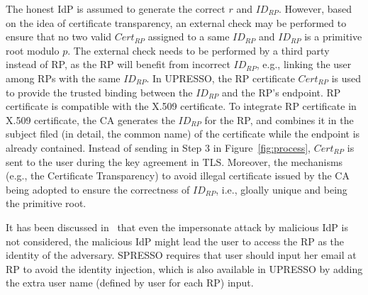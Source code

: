  The honest IdP is assumed to generate the correct $r$ and $ID_{RP}$. 
However, based on the idea of certificate transparency, 
an external check may be performed to ensure that  no two valid $Cert_{RP}$ assigned to a same $ID_{RP}$ and $ID_{RP}$ is a primitive root modulo $p$.
The external check needs to be performed by a third party instead of RP, as the RP will benefit from incorrect $ID_{RP}$, e.g., linking the user among RPs with the same  $ID_{RP}$. 
In UPRESSO, the RP certificate $Cert_{RP}$ is used to provide the trusted binding between the $ID_{RP}$ and the RP's endpoint. RP certificate is compatible with the X.509 certificate. To integrate RP certificate in X.509 certificate, the CA generates the $ID_{RP}$ for the RP, and combines it in the subject  filed (in detail, the common name)  of the certificate while the endpoint is already contained. Instead of sending  in Step 3 in Figure~\ref{fig:process}, $Cert_{RP}$  is sent to the user during the key agreement in TLS. Moreover, the mechanisms (e.g., the Certificate Transparency) to avoid illegal certificate issued by the CA being adopted to ensure the correctness of $ID_{RP}$, i.e., gloally unique and being the primitive root.



 It has been discussed in~\cite{SPRESSO} that even the impersonate attack by malicious IdP is not considered, the malicious IdP might lead the user to access the RP as the identity of the adversary. SPRESSO requires that user should input her email at RP to avoid the identity injection, which is also available in UPRESSO by adding the extra user name (defined by user for each RP) input.

